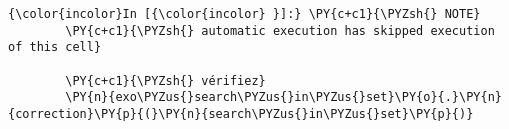     \begin{Verbatim}[commandchars=\\\{\}]
{\color{incolor}In [{\color{incolor} }]:} \PY{c+c1}{\PYZsh{} NOTE}
        \PY{c+c1}{\PYZsh{} automatic execution has skipped execution of this cell}
        
        \PY{c+c1}{\PYZsh{} vérifiez}
        \PY{n}{exo\PYZus{}search\PYZus{}in\PYZus{}set}\PY{o}{.}\PY{n}{correction}\PY{p}{(}\PY{n}{search\PYZus{}in\PYZus{}set}\PY{p}{)}
\end{Verbatim}



    
    
    
